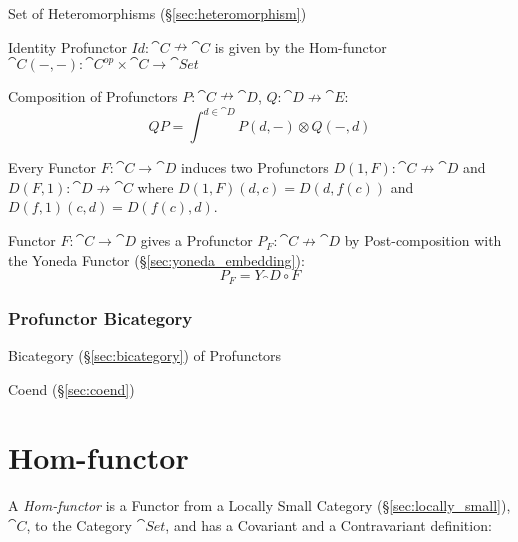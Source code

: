 Set of Heteromorphisms (\S\ref{sec:heteromorphism})

Identity Profunctor $Id : \cat{C} \nrightarrow \cat{C}$ is given by
the Hom-functor $\cat{C}(-,-) : \cat{C}^{op} \times \cat{C}
\rightarrow \cat{Set}$

Composition of Profunctors $P : \cat{C} \nrightarrow \cat{D}$, $Q :
\cat{D} \nrightarrow \cat{E}$:
\[
  Q P = \int^{d \in \cat{D}} P(d,-) \otimes Q(-,d)
\]

Every Functor $F : \cat{C} \rightarrow \cat{D}$ induces two
Profunctors $D(1,F) : \cat{C} \nrightarrow \cat{D}$ and $D(F,1)
: \cat{D} \nrightarrow \cat{C}$ where $D(1,F)(d,c) = D(d,f(c))$
and $D(f,1)(c,d) = D(f(c),d)$.

Functor $F : \cat{C} \rightarrow \cat{D}$ gives a Profunctor $P_F :
\cat{C} \nrightarrow \cat{D}$ by Post-composition with the Yoneda
Functor (\S\ref{sec:yoneda_embedding}):
\[
  P_F = Y_\cat{D} \circ F
\]



\subsubsection{Profunctor Bicategory}\label{sec:profunctor_bicategory}

Bicategory (\S\ref{sec:bicategory}) of Profunctors

Coend (\S\ref{sec:coend})



\section{Hom-functor}\label{sec:hom_functor}

A \emph{Hom-functor} is a Functor from a Locally Small Category
(\S\ref{sec:locally_small}), $\cat{C}$, to the Category $\cat{Set}$,
and has a Covariant and a Contravariant definition:

